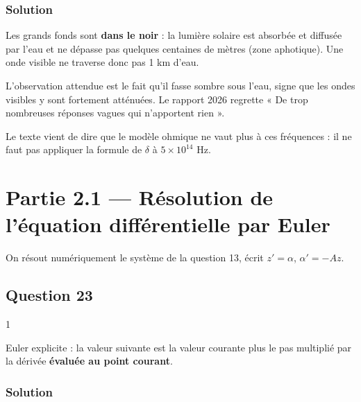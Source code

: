 \documentclass[11pt,a4paper]{article}
\begin{document}
\hypertarget{solution-21}{%
\subsubsection{Solution}\label{solution-21}}

Les grands fonds sont \textbf{dans le noir} : la lumière solaire est absorbée et diffusée par l'eau et ne dépasse pas quelques centaines de mètres (zone aphotique). Une onde visible ne traverse donc pas 1 km d'eau.

\begin{jury}

L'observation attendue est le fait qu'il fasse sombre sous l'eau, signe que les ondes visibles y sont fortement atténuées. Le rapport 2026 regrette « De trop nombreuses réponses vagues qui n'apportent rien ».

\end{jury}

\begin{piege}

Le texte vient de dire que le modèle ohmique ne vaut plus à ces fréquences : il ne faut pas appliquer la formule de \(\delta\) à \(5 \times 10^{14}\) Hz.

\end{piege}

\hypertarget{partie-2.1-ruxe9solution-de-luxe9quation-diffuxe9rentielle-par-euler}{%
\section{Partie 2.1 --- Résolution de l'équation différentielle par Euler}\label{partie-2.1-ruxe9solution-de-luxe9quation-diffuxe9rentielle-par-euler}}

On résout numériquement le système de la question 13, écrit \(z' = \alpha\), \(\alpha' = -Az\).

\hypertarget{question-23}{%
\subsection{Question 23}\label{question-23}}

\begin{indication}{1}

Euler explicite : la valeur suivante est la valeur courante plus le pas multiplié par la dérivée \textbf{évaluée au point courant}.

\end{indication}

\hypertarget{solution-22}{%
\subsubsection{Solution}\label{solution-22}}
\end{document}
